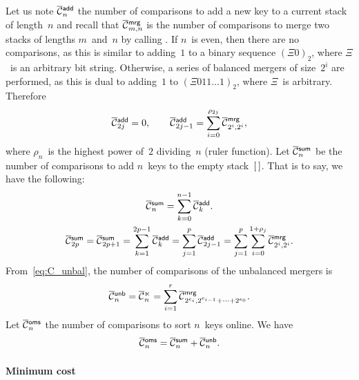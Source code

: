 Let us note \(\OC{\fun{add}}{n}\) the
number of comparisons to add a new key to a current stack of
length~\(n\) and recall that
\(\OC{\fun{mrg}}{m,n}\) is the number
of comparisons to merge two stacks of lengths \(m\)~and~\(n\) by
calling . If \(n\)~is even, then
there are no comparisons, as this is similar to adding~\(1\) to a
binary sequence \((\Xi{0})_2\), where \(\Xi\)~is an arbitrary bit
string. Otherwise, a series of balanced mergers of size~\(2^i\) are
performed, as this is dual to adding~\(1\) to \((\Xi{011}\ldots
1)_2\), where \(\Xi\)~is arbitrary. Therefore
\begin{equation*}
\OC{\fun{add}}{2j} = 0,\qquad
\OC{\fun{add}}{2j-1} = \sum_{i=0}^{\rho_{2j}}{\OC{\fun{mrg}}{2^i,2^i}},
\end{equation*}
where \(\rho_n\)~is the highest power of~\(2\) dividing~\(n\) (ruler
function).  Let
\(\OC{\fun{sum}}{n}\) be the number of
comparisons to add \(n\)~keys to the empty stack~\([\,]\). That is to
say, we have the following:
\begin{gather}
\OC{\fun{sum}}{n} = \sum_{k=0}^{n-1}{\OC{\fun{add}}{k}}.\notag\\[0mm]
\OC{\fun{sum}}{2p} = \OC{\fun{sum}}{2p+1}
= \sum_{k=1}^{2p-1}{\OC{\fun{add}}{k}}
= \sum_{j=1}^{p}{\OC{\fun{add}}{2j-1}}
= \sum_{j=1}^{p}\sum_{i=0}^{1+\rho_{j}}{\OC{\fun{mrg}}{2^i,2^i}}.
\label{eq:sum_2p}
\end{gather}
From~\eqref{eq:C_unbal}, the number of comparisons of the
unbalanced mergers is
\begin{equation}
\OC{\fun{unb}}{n}
= \OC{\ltimes}{n}
= \sum_{i=1}^{r}{\OC{\fun{mrg}}{2^{e_i},2^{e_{i-1}}+\dots+2^{e_0}}}.
\index{unb@$\OC{\fun{unb}}{n}$}
\label{eq:cost_unb}
\end{equation}
Let \(\OC{\fun{oms}}{n}\) the number of
comparisons to sort \(n\)~keys online. We have
\begin{equation}
\OC{\fun{oms}}{n} = \OC{\fun{sum}}{n} + \OC{\fun{unb}}{n}.
\index{sum@$\OC{\fun{sum}}{n}$}
\label{eq:ocost_online}
\end{equation}

\paragraph{Minimum cost}

